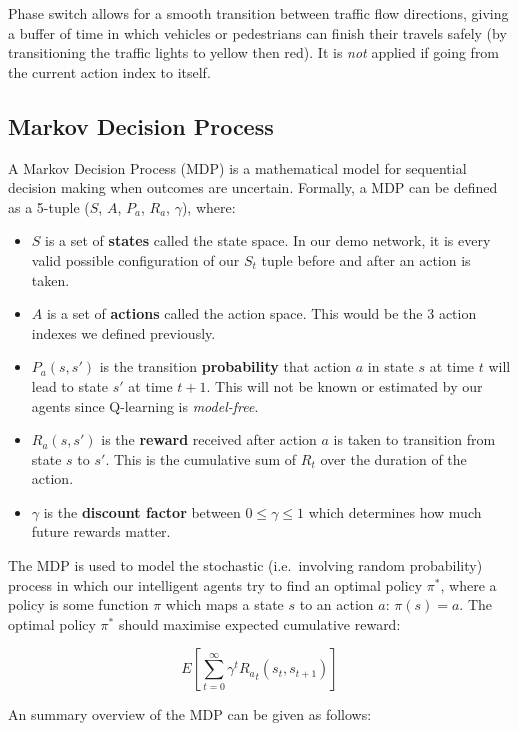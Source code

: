 \documentclass[a4paper]{report}
\begin{document}
Phase switch allows for a smooth transition between traffic flow directions, giving a buffer of time in which vehicles or pedestrians can finish their travels safely (by transitioning the traffic lights to yellow then red). It is \emph{not} applied if going from the current action index to itself.

\subsection{Markov Decision Process}

A Markov Decision Process (MDP) is a mathematical model for sequential decision making when outcomes are uncertain. Formally, a MDP can be defined as a 5-tuple ($S$, $A$, $P_a$, $R_a$, $\gamma$), where:

\begin{itemize}
  \item $S$ is a set of \textbf{states} called the state space. In our demo network, it is every valid possible configuration of our $S_t$ tuple before and after an action is taken.
  \item $A$ is a set of \textbf{actions} called the action space. This would be the 3 action indexes we defined previously.
  \item $P_a(s,s')$ is the transition \textbf{probability} that action $a$ in state $s$ at time $t$ will lead to state $s'$ at time $t+1$. This will not be known or estimated by our agents since Q-learning is \emph{model-free}.
  \item $R_a(s,s')$ is the \textbf{reward} received after action $a$ is taken to transition from state $s$ to $s'$. This is the cumulative sum of $R_t$ over the duration of the action.
  \item $\gamma$ is the \textbf{discount factor} between $0 \leq \gamma \leq 1$ which determines how much future rewards matter.  
\end{itemize}

The MDP is used to model the stochastic (i.e.\ involving random probability) process in which our intelligent agents try to find an optimal policy $\pi^*$, where a policy is some function $\pi$ which maps a state $s$ to an action $a$: $\pi(s)=a$. The optimal policy $\pi^*$ should maximise expected cumulative reward:

\[
E\left[\sum_{t=0}^{\infty}\gamma^t{R_a}_t(s_t,s_{t+1})\right]
\]

An summary overview of the MDP can be given as follows:
\end{document}
